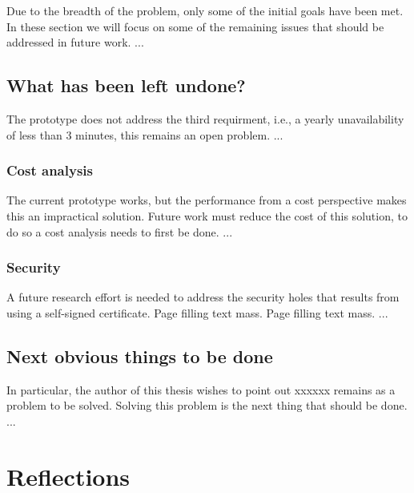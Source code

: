 \documentclass[english, bibtex]{kththesis}
\begin{document}
Due to the breadth of the problem, only some of the initial goals have been
met. In these section we will focus on some of the remaining issues that
should be addressed in future work. ...

\subsection{What has been left undone?}
\label{what-has-been-left-undone}

The prototype does not address the third requirment, i.e., a yearly
unavailability of less than 3 minutes, this remains an open problem. ...

\subsubsection{Cost analysis}

The current prototype works, but the performance from a cost perspective makes
this an impractical solution. Future work must reduce the cost of this
solution, to do so a cost analysis needs to first be done. ...

\subsubsection{Security}

A future research effort is needed to address the security holes that results
from using a self-signed certificate. Page filling text mass. Page filling
text mass. ...


\subsection{Next obvious things to be done}

In particular, the author of this thesis wishes to point out xxxxxx remains as
a problem to be solved. Solving this problem is the next thing that should be
done. ...

\section{Reflections}
\label{sec:reflections}
\end{document}
